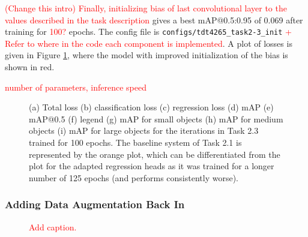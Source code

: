 \documentclass{article}
\begin{document}
\textcolor{red}{(Change this intro) Finally, initializing bias of last convolutional layer to the values described in the task description} gives a best mAP@0.5:0.95 of 0.069  after training for \textcolor{red}{100?} epochs. The config file is \texttt{configs/tdt4265\_task2-3\_init} \textcolor{red}{ + Refer to where in the code each component is implemented}. A plot of losses is given in Figure \ref{fig:loss-2-3}, where the model with improved initialization of the bias is shown in red.

\textcolor{red}{number of parameters, inference speed}

\begin{figure}[t!]
    \centering
    \subfigure[]{}
    \subfigure[]{}
    \subfigure[]{}
    \subfigure[]{}
    \subfigure[]{}
    \subfigure[]{}
    \subfigure[]{}
    \subfigure[]{}
    \caption{(a) Total loss (b) classification loss (c) regression loss (d) mAP (e) mAP@0.5 (f) legend (g) mAP for small objects (h) mAP for medium objects (i) mAP for large objects for the iterations in Task 2.3 trained for 100 epochs. The baseline system of Task 2.1 is represented by the orange plot, which can be differentiated from the plot for the adapted regression heads as it was trained for a longer number of 125 epochs (and performs consistently worse).}
    \label{fig:loss-2-3}
\end{figure}

\subsubsection*{Adding Data Augmentation Back In}

\begin{figure}[]
    \centering
    \subfigure[]{}
    \subfigure[]{}
    \caption{\textcolor{red}{Add caption.}}
    \label{fig:data_augment_comparison}
\end{figure}
\end{document}

